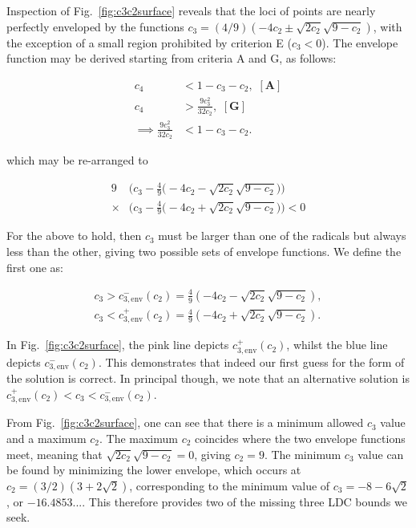 Inspection of Fig.~\ref{fig:c3c2surface} reveals that the loci of points are
nearly perfectly enveloped by the functions $c_3=(4/9) (-4c_2 \pm \sqrt{2 c_2} 
\sqrt{9-c_2})$, with the exception of a small region prohibited by criterion E
($c_3<0$). The envelope function may be derived starting from criteria A and G,
as follows:

\begin{align}
c_4 &< 1 - c_3 - c_2,\,\,\mathbf{[A]}\nonumber\\
c_4 &> \frac{9 c_3^2}{32 c_2},\,\,\mathbf{[G]}\nonumber\\
\implies \frac{9 c_3^2}{32 c_2} &< 1 - c_3 - c_2.
\end{align}

which may be re-arranged to

\begin{align}
9 &\Big( c_3 - \frac{4}{9} \big(-4c_2 - \sqrt{2 c_2} \sqrt{9-c_2}\big) \Big) \nonumber\\
\times &\Big( c_3 - \frac{4}{9} \big(-4c_2 + \sqrt{2 c_2} \sqrt{9-c_2}\big) \Big) < 0
\end{align}

For the above to hold, then $c_3$ must be larger than one of the radicals but
always less than the other, giving two possible sets of envelope functions.
We define the first one as:

\begin{align}
c_3 > c_{3,\mathrm{env}}^{-}(c_2) = \frac{4}{9} (-4c_2 - \sqrt{2 c_2} \sqrt{9-c_2}), \\
c_3 < c_{3,\mathrm{env}}^{+}(c_2) = \frac{4}{9} (-4c_2 + \sqrt{2 c_2} \sqrt{9-c_2}).
\end{align}

In Fig.~\ref{fig:c3c2surface}, the pink line depicts 
$c_{3,\mathrm{env}}^{+}(c_2)$, whilst the blue line depicts 
$c_{3,\mathrm{env}}^{-}(c_2)$. This demonstrates that indeed our first guess for
the form of the solution is correct. In principal though, we note that an 
alternative solution is $c_{3,\mathrm{env}}^{+}(c_2)<c_3<
c_{3,\mathrm{env}}^{-}(c_2)$.

From Fig.~\ref{fig:c3c2surface}, one can see that there is a minimum allowed
$c_3$ value and a maximum $c_2$. The maximum $c_2$ coincides where the two
envelope functions meet, meaning that $\sqrt{2 c_2} \sqrt{9-c_2}=0$, giving
$c_2=9$. The minimum $c_3$ value can be found by minimizing the lower envelope,
which occurs at $c_2=(3/2)(3+2\sqrt{2})$, corresponding to the minimum value of
$c_3=-8-6\sqrt{2}$, or $-16.4853...$. This therefore provides two of the missing
three LDC bounds we seek.

